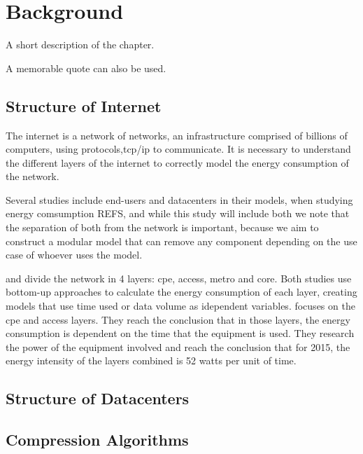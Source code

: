 

\chapter{Background}
\label{chapter:background}

\begin{introduction}
A short description of the chapter.

A memorable quote can also be used.
\end{introduction}

\section{Structure of Internet}

The internet is a network of networks, an infrastructure comprised of billions of computers, 
using protocols,\ac{tcp}/\ac{ip} to communicate. 
It is necessary to understand the different layers of the internet to correctly model the 
energy consumption of the network.

Several studies include end-users and datacenters in their models, when studying 
energy comsumption REFS, and while this study will include both we note that the 
separation of both from the network is important, because we aim to
construct a modular model that can remove any component depending on
the use case of whoever uses the model.

\citet{Coroama2015} and \citet{Schien2015} divide the network in 4 layers: \ac{cpe}, access, 
metro and core. Both studies use bottom-up approaches to calculate the energy consumption 
of each layer, creating models that use time used or data volume as idependent variables.
\citet{Coroama2015} focuses on the \ac{cpe} and access layers. They reach the conclusion that
in those layers, the energy consumption is dependent on the time that the equipment is used.
They research the power of the equipment involved and reach the conclusion that for 2015,
the energy intensity of the layers combined is 52 \ac{watts} per unit of time.



\section{Structure of Datacenters}

\section{Compression Algorithms}